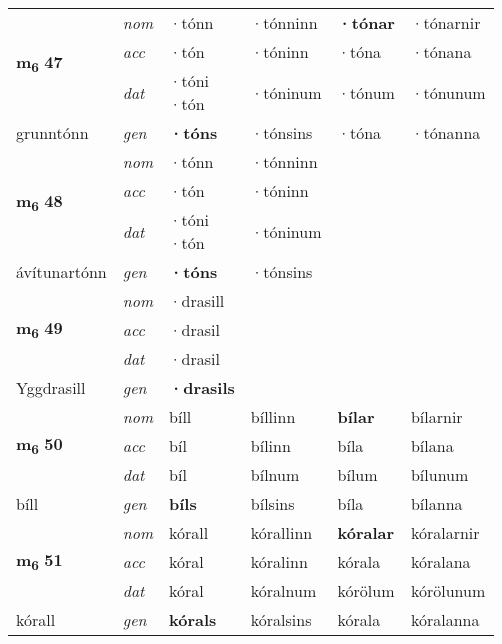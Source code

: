 \begin{longtable}[l]{X>{\footnotesize\itshape}XXXXX}
\multirow{3}{*}{{{\textbf{m{\textsubscript{6}}} \Large{\textbf{47}}}}}  
 & nom & ·tónn & ·tónninn    & \textbf{·tónar} & ·tónarnir  \\*
 & acc & ·tón  & ·tóninn   & ·tóna  & ·tónana \\*
 & dat & \specialcell{·tóni\\  ·tón} & ·tóninum   & ·tónum & ·tónunum \\*
 {\footnotesize{grunntónn}} &  gen & \textbf{·tóns}  & ·tónsins  & ·tóna & ·tónanna \\
\cmidrule{1-6}


\multirow{3}{*}{{{\textbf{m{\textsubscript{6}}} \Large{\textbf{48}}}}}  
 & nom & ·tónn & ·tónninn    & \textbf{} &   \\*
 & acc & ·tón  & ·tóninn   &   &  \\*
 & dat & \specialcell{·tóni\\  ·tón} & ·tóninum   &  &  \\*
 {\footnotesize{ávítunartónn}} &  gen & \textbf{·tóns}  & ·tónsins  &  &  \\
\cmidrule{1-6}


\multirow{3}{*}{{{\textbf{m{\textsubscript{6}}} \Large{\textbf{49}}}}}  
 & nom & ·drasill &     & \textbf{} &   \\*
 & acc & ·drasil  &    &   &  \\*
 & dat & ·drasil &    &  &  \\*
 {\footnotesize{Yggdrasill}} &  gen & \textbf{·drasils}  &   &  &  \\
\cmidrule{1-6}


\multirow{3}{*}{{{\textbf{m{\textsubscript{6}}} \Large{\textbf{50}}}}}  
 & nom & bíll & bíllinn    & \textbf{bílar} & bílarnir  \\*
 & acc & bíl  & bílinn   & bíla  & bílana \\*
 & dat & bíl & bílnum   & bílum & bílunum \\*
 {\footnotesize{bíll}} &  gen & \textbf{bíls}  & bílsins  & bíla & bílanna \\
\cmidrule{1-6}


\multirow{3}{*}{{{\textbf{m{\textsubscript{6}}} \Large{\textbf{51}}}}}  
 & nom & kórall & kórallinn    & \textbf{kóralar} & kóralarnir  \\*
 & acc & kóral  & kóralinn   & kórala  & kóralana \\*
 & dat & kóral & kóralnum   & kórölum & kórölunum \\*
 {\footnotesize{kórall}} &  gen & \textbf{kórals}  & kóralsins  & kórala & kóralanna \\
\cmidrule{1-6}



\end{longtable}
